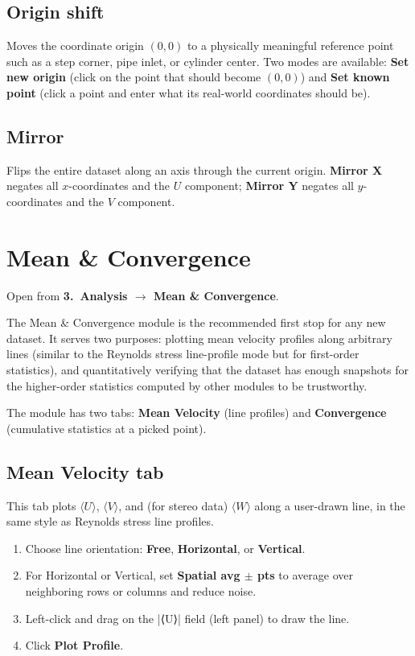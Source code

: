 \documentclass[11pt, a4paper]{report}
\newcommand{\uipth}[1]{\textbf{\textcolor{upblue}{#1}}}
\begin{document}
\section{Origin shift}

Moves the coordinate origin $(0, 0)$ to a physically meaningful reference point such as a step corner, pipe inlet, or cylinder center. Two modes are available: \uipth{Set new origin} (click on the point that should become $(0, 0)$) and \uipth{Set known point} (click a point and enter what its real-world coordinates should be).

\section{Mirror}

Flips the entire dataset along an axis through the current origin. \uipth{Mirror X} negates all $x$-coordinates and the $U$ component; \uipth{Mirror Y} negates all $y$-coordinates and the $V$ component.

\chapter{Mean \& Convergence}
\label{ch:meanconv}

Open from \uipth{3.\ Analysis $\to$ Mean \& Convergence}.

The Mean \& Convergence module is the recommended first stop for any new dataset. It serves two purposes: plotting mean velocity profiles along arbitrary lines (similar to the Reynolds stress line-profile mode but for first-order statistics), and quantitatively verifying that the dataset has enough snapshots for the higher-order statistics computed by other modules to be trustworthy.

The module has two tabs: \uipth{Mean Velocity} (line profiles) and \uipth{Convergence} (cumulative statistics at a picked point).

\section{Mean Velocity tab}
\label{sec:meanvel}

This tab plots $\langle U \rangle$, $\langle V \rangle$, and (for stereo data) $\langle W \rangle$ along a user-drawn line, in the same style as Reynolds stress line profiles.

\begin{stepbox}
\begin{enumerate}[leftmargin=1.5em, topsep=2pt]
  \item Choose line orientation: \uipth{Free}, \uipth{Horizontal}, or \uipth{Vertical}.
  \item For Horizontal or Vertical, set \uipth{Spatial avg $\pm$ pts} to average over neighboring rows or columns and reduce noise.
  \item Left-click and drag on the |⟨U⟩| field (left panel) to draw the line.
  \item Click \uipth{Plot Profile}.
\end{enumerate}
\end{stepbox}
\end{document}
